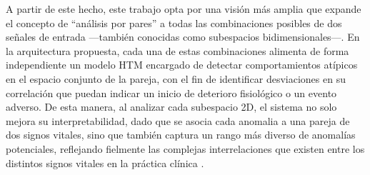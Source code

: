 A partir de este hecho, este trabajo opta por una visión más amplia que expande el concepto de “análisis por pares” a todas las combinaciones posibles de dos señales de entrada —también conocidas como subespacios bidimensionales—. En la arquitectura propuesta, cada una de estas combinaciones alimenta de forma independiente un modelo HTM encargado de detectar comportamientos atípicos en el espacio conjunto de la pareja, con el fin de identificar desviaciones en su correlación que puedan indicar un inicio de deterioro fisiológico o un evento adverso. De esta manera, al analizar cada subespacio 2D, el sistema no solo mejora su interpretabilidad, dado que se asocia cada anomalia a una pareja de dos signos vitales, sino que también captura un rango más diverso de anomalías potenciales, reflejando fielmente las complejas interrelaciones que existen entre los distintos signos vitales en la práctica clínica \parencite{Pieroni2023}.
